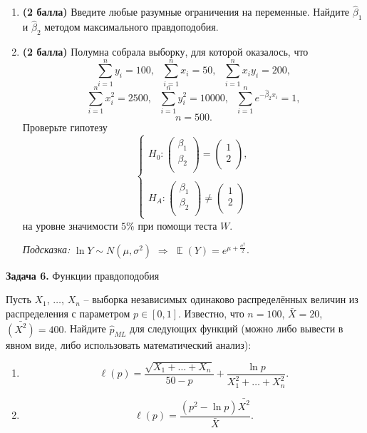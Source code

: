 \documentclass[10pt, a4paper]{extarticle}
\DeclareMathOperator{\E}{\mathbb{E}}
\begin{document}
	\begin{enumerate}
		\item \textbf{(2 балла)} Введите любые разумные ограничения на переменные. Найдите $\hat{\beta}_1$ и $\hat{\beta}_2$ методом максимального правдоподобия.
		\item  \textbf{(2 балла)} Полумна собрала выборку, для которой оказалось, что 
		\[
		\sum_{i=1}^n y_i = 100, \text{ } \sum_{i = 1}^n x_i = 50,\text{ } \sum_{i = 1}^n x_iy_i = 200,
		\]
		\[
		\sum_{i = 1}^n x^2_i = 2500, \text{ } \sum_{i = 1}^n y^2_i = 10000, \text{ } \sum_{i=1}^ne^{-\hat{\beta}_2x_i} = 1,
		\]
		\[
		n = 500.
		\]
		Проверьте гипотезу
		\[
		\begin{cases}
		H_0: \begin{pmatrix}
			\beta_1 \\
			\beta_2 \\
		\end{pmatrix} = 
		\begin{pmatrix}
			1 \\
			2 \\
		\end{pmatrix}, \\\\
		 H_A: \begin{pmatrix}
			\beta_1 \\
			\beta_2 \\
		\end{pmatrix} \ne
		\begin{pmatrix}
			1 \\
			2 \\
		\end{pmatrix}
		\end{cases}
		\]
		на уровне значимости $5\%$ при помощи теста $W$.
		
		\textit{Подсказка:} $\ln Y \sim N(\mu, \sigma^2)$ $\Rightarrow$ $\E(Y) = e^{\mu + \frac{\sigma^2}{2}}$.
	\end{enumerate}

	{\Large \textbf{Задача 6.} Функции правдоподобия}
	
	Пусть $X_1$, $\ldots$, $X_n$ – выборка независимых одинаково распределённых величин из распределения с параметром $p \in [0, 1]$. Известно, что $n = 100$, $\bar{X} = 20$, $\bar{(X^2)} = 400$. Найдите $\hat{p}_{ML}$ для следующих функций (можно либо вывести в явном виде, либо использовать математический анализ):
	\begin{enumerate}
		\item 
		\[
		\ell(p) = \dfrac{\sqrt{X_1 + \ldots + X_n}}{50 - p} + \dfrac{\ln p}{X_1^2 + \ldots + X_n^2}.
		\]
		\item \[
		\ell(p) = \dfrac{(p^2 - \ln p)\bar{X^2}}{\bar{X}}.
		\]
	\end{enumerate}
\end{document}
